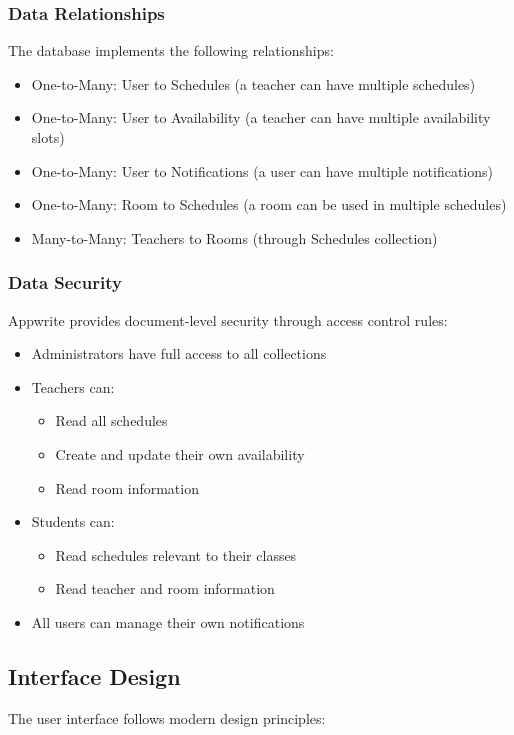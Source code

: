 \documentclass[12pt,a4paper]{report}
\begin{document}
\subsubsection{Data Relationships}
The database implements the following relationships:

\begin{itemize}
    \item One-to-Many: User to Schedules (a teacher can have multiple schedules)
    \item One-to-Many: User to Availability (a teacher can have multiple availability slots)
    \item One-to-Many: User to Notifications (a user can have multiple notifications)
    \item One-to-Many: Room to Schedules (a room can be used in multiple schedules)
    \item Many-to-Many: Teachers to Rooms (through Schedules collection)
\end{itemize}

\subsubsection{Data Security}
Appwrite provides document-level security through access control rules:

\begin{itemize}
    \item Administrators have full access to all collections
    \item Teachers can:
        \begin{itemize}
            \item Read all schedules
            \item Create and update their own availability
            \item Read room information
        \end{itemize}
    \item Students can:
        \begin{itemize}
            \item Read schedules relevant to their classes
            \item Read teacher and room information
        \end{itemize}
    \item All users can manage their own notifications
\end{itemize}

\subsection{Interface Design}
The user interface follows modern design principles:
\end{document}
